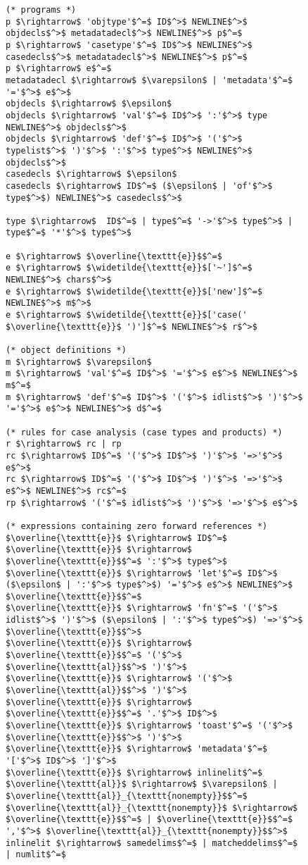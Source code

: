 
\begin{figure}
\begin{lstlisting}[mathescape]
(* programs *)
p $\rightarrow$ 'objtype'$^=$ ID$^>$ NEWLINE$^>$ objdecls$^>$ metadatadecl$^>$ NEWLINE$^>$ p$^=$
p $\rightarrow$ 'casetype'$^=$ ID$^>$ NEWLINE$^>$ casedecls$^>$ metadatadecl$^>$ NEWLINE$^>$ p$^=$
p $\rightarrow$ e$^=$
metadatadecl $\rightarrow$ $\varepsilon$ | 'metadata'$^=$ '='$^>$ e$^>$ 
objdecls $\rightarrow$ $\epsilon$
objdecls $\rightarrow$ 'val'$^=$ ID$^>$ ':'$^>$ type NEWLINE$^>$ objdecls$^>$
objdecls $\rightarrow$ 'def'$^=$ ID$^>$ '('$^>$ typelist$^>$ ')'$^>$ ':'$^>$ type$^>$ NEWLINE$^>$ objdecls$^>$
casedecls $\rightarrow$ $\epsilon$
casedecls $\rightarrow$ ID$^=$ ($\epsilon$ | 'of'$^>$ type$^>$) NEWLINE$^>$ casedecls$^>$

type $\rightarrow$  ID$^=$ | type$^=$ '->'$^>$ type$^>$ | type$^=$ '*'$^>$ type$^>$

e $\rightarrow$ $\overline{\texttt{e}}$$^=$
e $\rightarrow$ $\widetilde{\texttt{e}}$['~']$^=$ NEWLINE$^>$ chars$^>$
e $\rightarrow$ $\widetilde{\texttt{e}}$['new']$^=$ NEWLINE$^>$ m$^>$
e $\rightarrow$ $\widetilde{\texttt{e}}$['case(' $\overline{\texttt{e}}$ ')']$^=$ NEWLINE$^>$ r$^>$

(* object definitions *)
m $\rightarrow$ $\varepsilon$
m $\rightarrow$ 'val'$^=$ ID$^>$ '='$^>$ e$^>$ NEWLINE$^>$ m$^=$
m $\rightarrow$ 'def'$^=$ ID$^>$ '('$^>$ idlist$^>$ ')'$^>$ '='$^>$ e$^>$ NEWLINE$^>$ d$^=$

(* rules for case analysis (case types and products) *)
r $\rightarrow$ rc | rp
rc $\rightarrow$ ID$^=$ '('$^>$ ID$^>$ ')'$^>$ '=>'$^>$ e$^>$
rc $\rightarrow$ ID$^=$ '('$^>$ ID$^>$ ')'$^>$ '=>'$^>$ e$^>$ NEWLINE$^>$ rc$^=$
rp $\rightarrow$ '('$^=$ idlist$^>$ ')'$^>$ '=>'$^>$ e$^>$

(* expressions containing zero forward references *)
$\overline{\texttt{e}}$ $\rightarrow$ ID$^=$
$\overline{\texttt{e}}$ $\rightarrow$ $\overline{\texttt{e}}$$^=$ ':'$^>$ type$^>$
$\overline{\texttt{e}}$ $\rightarrow$ 'let'$^=$ ID$^>$ ($\epsilon$ | ':'$^>$ type$^>$) '='$^>$ e$^>$ NEWLINE$^>$ $\overline{\texttt{e}}$$^=$
$\overline{\texttt{e}}$ $\rightarrow$ 'fn'$^=$ '('$^>$ idlist$^>$ ')'$^>$ ($\epsilon$ | ':'$^>$ type$^>$) '=>'$^>$ $\overline{\texttt{e}}$$^>$
$\overline{\texttt{e}}$ $\rightarrow$ $\overline{\texttt{e}}$$^=$ '('$^>$ $\overline{\texttt{al}}$$^>$ ')'$^>$
$\overline{\texttt{e}}$ $\rightarrow$ '('$^>$ $\overline{\texttt{al}}$$^>$ ')'$^>$
$\overline{\texttt{e}}$ $\rightarrow$ $\overline{\texttt{e}}$$^=$ '.'$^>$ ID$^>$
$\overline{\texttt{e}}$ $\rightarrow$ 'toast'$^=$ '('$^>$ $\overline{\texttt{e}}$$^>$ ')'$^>$
$\overline{\texttt{e}}$ $\rightarrow$ 'metadata'$^=$ '['$^>$ ID$^>$ ']'$^>$ 
$\overline{\texttt{e}}$ $\rightarrow$ inlinelit$^=$
$\overline{\texttt{al}}$ $\rightarrow$ $\varepsilon$ | $\overline{\texttt{al}}_{\texttt{nonempty}}$$^=$
$\overline{\texttt{al}}_{\texttt{nonempty}}$ $\rightarrow$ $\overline{\texttt{e}}$$^=$ | $\overline{\texttt{e}}$$^=$ ','$^>$ $\overline{\texttt{al}}_{\texttt{nonempty}}$$^>$
inlinelit $\rightarrow$ samedelims$^=$ | matcheddelims$^=$ | numlit$^=$


\end{lstlisting}
\end{figure}
